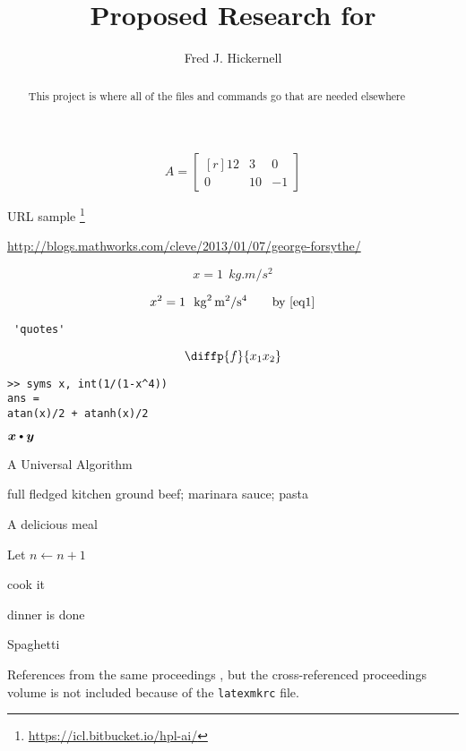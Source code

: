 \documentclass{amsart}
\begin{document}
\title{Proposed Research for }
\author{Fred J. Hickernell}
\begin{abstract}This project is where all of the files and commands go that are needed elsewhere
\end{abstract}

\maketitle

\[
A = \begin{bmatrix*}[r]
     12 & 3  & 0 \\
     0  & 10 &-1 
   \end{bmatrix*}
\]

URL sample \footnote{\url{https://icl.bitbucket.io/hpl-ai/}}

\url{http://blogs.mathworks.com/cleve/2013/01/07/george-forsythe/}

\begin{equation} \label{eq1}
    x = 1 \ \ \si{kg.m/s^2}
\end{equation}

\begin{equation}
    x^2 = 1 \ \ \si{kg^2.m^2/s^4} \qquad \text{by } \eqref{eq1}
\end{equation}

\begin{verbatim} 'quotes' \end{verbatim}

\[
\diffp{f}{{x_1}{x_2}}
\]


\begin{Verbatim}[fontsize=\small,formatcom=\color{blue}]
>> syms x, int(1/(1-x^4))
ans =
atan(x)/2 + atanh(x)/2
\end{Verbatim}

$\vx \bigcdot \vy$

\begin{algorithm}[H]
\caption{A Universal Algorithm \label{alg:basicadapt}}
	\begin{algorithmic}
	\PARAM full fledged kitchen
	\INPUT ground beef; marinara sauce; pasta

    \Ensure A delicious meal

\Repeat

\State Let $n \leftarrow n + 1$

\State cook it

\Until dinner is done

\RETURN Spaghetti

\end{algorithmic}
\end{algorithm}

References from the same proceedings \cite{HicJim16a,JimHic16a}, but the cross-referenced proceedings volume is not included because of the \texttt{latexmkrc} file.



\end{document}

